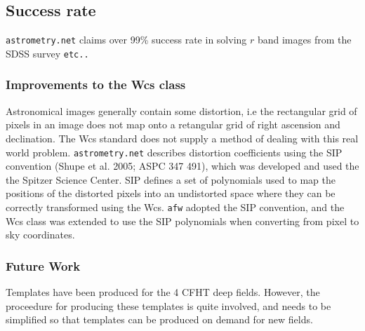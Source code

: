 \subsection{Success rate}
{\tt astrometry.net} claims over 99\% success rate in solving $r$ band images from the SDSS survey {\tt etc..}

\subsubsection{Improvements to the Wcs class}
Astronomical images generally contain some distortion, i.e the rectangular grid of pixels in an image does not map onto a retangular grid of right ascension and declination. The Wcs standard does not supply a method of dealing with this real world problem. {\tt astrometry.net} describes distortion coefficients using the SIP convention (Shupe et al. 2005; ASPC 347 491), which was developed and used the the Spitzer Science Center. SIP defines a set of polynomials used to map the positions of the distorted pixels into an undistorted space where they can be correctly transformed using the Wcs. {\tt afw} adopted the SIP convention, and the Wcs class was extended to use the SIP polynomials when converting from pixel to sky coordinates.


\subsubsection{Future Work}
Templates have been produced for the 4 CFHT deep fields. However, the proceedure for producing these templates is quite involved, and needs to be simplified so that templates can be produced on demand for new fields.
